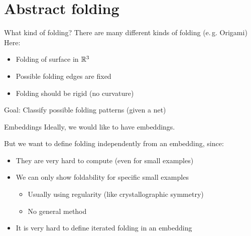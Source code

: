 \section{Abstract folding}
\frame{\tableofcontents[currentsection]}

\begin{frame}{What kind of folding?}
    \pause
    There are many different kinds of folding (e.\,g. Origami)
    \pause
    Here:
    \begin{itemize}
        \pause
        \item Folding of surface in $\mathbb{R}^3$
        \pause
        \item Possible folding edges are fixed
        \pause
        \item Folding should be rigid (no curvature)
    \end{itemize}

    \pause
    Goal: Classify possible folding patterns (given a net)

    \pause
    \begin{center}
    \end{center}

\end{frame}


\begin{frame}{Embeddings}
    \pause
    Ideally, we would like to have embeddings.
    
    \pause
    But we want to define folding independently from an embedding, since:

    \begin{itemize}
        \pause
        \item They are very hard to compute (even for small examples)
        \pause
        \item We can only show foldability for specific small examples
            \begin{itemize}
                \pause
                \item Usually using regularity (like crystallographic symmetry)
                \pause
                \item No general method
            \end{itemize}
        \pause
        \item It is very hard to define iterated folding in an embedding
    \end{itemize}

    \pause
    \begin{center}
    \end{center}

\end{frame}

